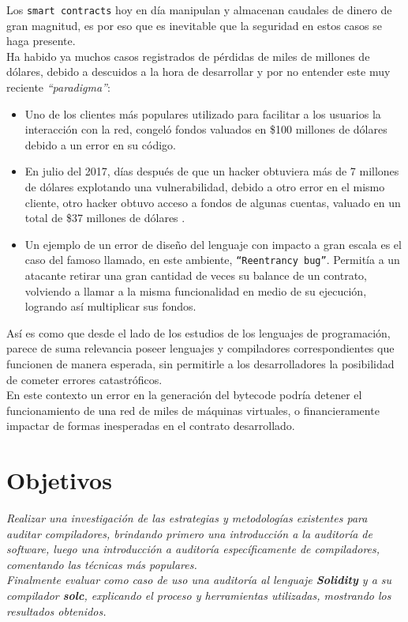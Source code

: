Los \texttt{smart contracts} hoy en día manipulan y almacenan caudales de dinero de gran magnitud, es por eso que es inevitable que la seguridad en estos casos se haga presente.\\

Ha habido ya muchos casos registrados de pérdidas de miles de millones de dólares, debido a descuidos a la hora de desarrollar y por no entender este muy reciente \textit{“paradigma”}:
\begin{itemize}
\item Uno de los clientes más populares utilizado para facilitar a los usuarios la interacción con la red, congeló fondos valuados en \$100 millones de dólares debido a un error en su código\cite{Hertig:Alyssa:Coindesk}.
\item En julio del 2017, días después de que un hacker obtuviera más de 7 millones de dólares explotando una vulnerabilidad, debido a otro error en el mismo cliente, otro hacker obtuvo acceso a fondos de algunas cuentas, valuado en un total de \$37 millones de dólares \cite{Pearson:Jordan:Motherboard}.
\item Un ejemplo de un error de diseño del lenguaje con impacto a gran escala es el caso del famoso llamado, en este ambiente, \texttt{“Reentrancy bug”}. Permitía a un atacante retirar una gran cantidad de veces su balance de un contrato, volviendo a llamar a la misma funcionalidad en medio de su ejecución, logrando así multiplicar sus fondos\cite{Vessenes:Peter:Vessenes}.
\end{itemize}
\bigskip

Así es como que desde el lado de los estudios de los lenguajes de programación, parece de suma relevancia poseer lenguajes y compiladores correspondientes que funcionen de manera esperada, sin permitirle a los desarrolladores la posibilidad de cometer errores catastróficos.\\

En este contexto un error en la generación del bytecode podría detener el funcionamiento de una red de miles de máquinas virtuales, o financieramente impactar de formas inesperadas en el contrato desarrollado.

\section{Objetivos}
\textit{Realizar una investigación de las estrategias y metodologías existentes para auditar compiladores, brindando primero una introducción a la auditoría de software, luego una introducción a auditoría específicamente de compiladores, comentando las técnicas más populares.}\\

\textit{Finalmente evaluar como caso de uso una auditoría al lenguaje \textbf{Solidity} y a su compilador \textbf{solc}, explicando el proceso y herramientas utilizadas, mostrando los resultados obtenidos.}
